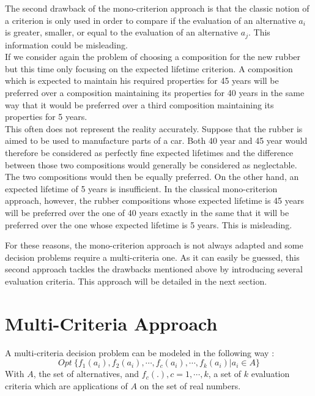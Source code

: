 The second drawback of the mono-criterion approach is that the classic notion of a criterion is only used in order to compare if the evaluation of an alternative $a_i$ is greater, smaller, or equal to the evaluation of an alternative $a_j$. This information could be misleading.\\
If we consider again the problem of choosing a composition for the new rubber but this time only focusing on the expected lifetime criterion. A composition which is expected to maintain his required properties for 45 years will be preferred over a composition maintaining its properties for 40 years in the same way that it would be preferred over a third composition maintaining its properties for 5 years.\\
This often does not represent the reality accurately. Suppose that the rubber is aimed to be used to manufacture parts of a car.
Both 40 year and 45 year would therefore be considered as perfectly fine expected lifetimes and the difference between those two compositions would generally be considered as neglectable.
The two compositions would then be equally preferred.
On the other hand, an expected lifetime of 5 years is insufficient.
In the classical mono-criterion approach, however, the rubber compositions whose expected lifetime is 45 years will be preferred over the one of 40 years exactly in the same that it will be preferred over the one whose expected lifetime is 5 years. This is misleading.

For these reasons, the mono-criterion approach is not always adapted and some decision problems require a multi-criteria one. As it can easily be guessed, this second approach tackles the drawbacks mentioned above by introducing several evaluation criteria. This approach will be detailed in the next section.

\section{Multi-Criteria Approach} \label{sec:Multi-criterion_approach}

A multi-criteria decision problem can be modeled in the following way \cite{Bertrand2002}:
\begin{equation}
    Opt \  \{f_1(a_i), f_2(a_i), \cdots , f_c(a_i), \cdots , f_k(a_i) | a_i \in A\}
    \label{eq:multicriteria_pb_model}
\end{equation}
With $A$, the set of alternatives, and $f_c(.), c=1,\cdots ,k$, a set of $k$ evaluation criteria which are applications of $A$ on the set of real numbers. \\

